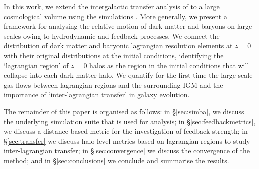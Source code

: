 In this work, we extend the intergalactic transfer analysis of
\citet{AnglesAlcazar2017} to a large cosmological volume using the \simba{}
simulations \citep{Dave2019}. More generally, we present a framework for
analysing the relative motion of dark matter and baryons on large scales
owing to hydrodynamic and feedback processes. We connect the distribution of
dark matter and baryonic lagrangian resolution elements at $z=0$ with their
original distributions at the initial conditions, identifying the `lagrangian
region' of $z=0$ halos as the region in the initial conditions that will
collapse into each dark matter halo. We quantify for the first time the large
scale gas flows between lagrangian regions and the surrounding IGM and the
importance of `inter-lagrangian transfer' in galaxy evolution.

The remainder of this paper is organised as follows: in \S\ref{sec:simba}, we
discuss the underlying \simba{} simulation suite that is used for analysis;
in \S\ref{sec:feedbackmetrics}, we discuss a distance-based metric for the
investigation of feedback strength; in \S\ref{sec:transfer} we discuss
halo-level metrics based on lagrangian regions to study inter-lagrangian
transfer; in \S\ref{sec:convergence} we discuss the convergence of the method;
and in \S\ref{sec:conclusions} we conclude and summarise the results.